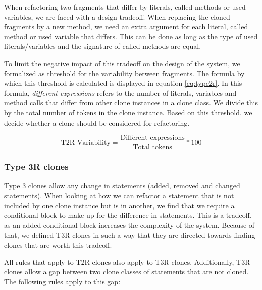 \documentclass[a4paper]{article}
\begin{document}
When refactoring two fragments that differ by literals, called methods or used variables, we are faced with a design tradeoff. When replacing the cloned fragments by a new method, we need an extra argument for each literal, called method or used variable that differs. This can be done as long as the type of used literals/variables and the signature of called methods are equal.

To limit the negative impact of this tradeoff on the design of the system, we formalized as threshold for the variability between fragments. The formula by which this threshold is calculated is displayed in equation \ref{eq:type2r}. In this formula, \textit{different expressions} refers to the number of literals, variables and method calls that differ from other clone instances in a clone class. We divide this by the total number of tokens in the clone instance. Based on this threshold, we decide whether a clone should be considered for refactoring.

\begin{equation}\label{eq:type2r}
\text{T2R Variability}=\frac{\text{Different expressions}}{\text{Total tokens}}*100
\end{equation}

\subsubsection{Type 3R clones}\label{sec:type3r}
Type 3 clones allow any change in statements (added, removed and changed statements). When looking at how we can refactor a statement that is not included by one clone instance but is in another, we find that we require a conditional block to make up for the difference in statements. This is a tradeoff, as an added conditional block increases the complexity of the system. Because of that, we defined T3R clones in such a way that they are directed towards finding clones that are worth this tradeoff.

All rules that apply to T2R clones also apply to T3R clones. Additionally, T3R clones allow a gap between two clone classes of statements that are not cloned. The following rules apply to this gap:
\end{document}
